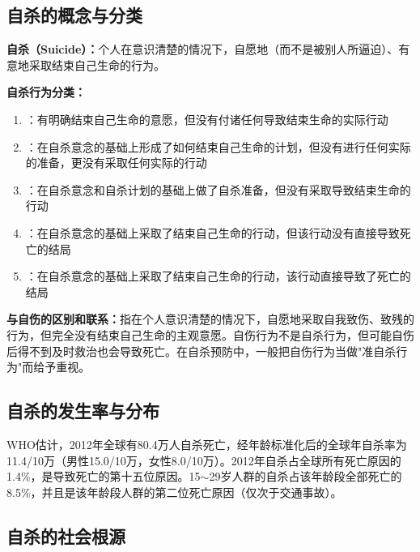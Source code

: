 \subsection{自杀的概念与分类}

\begin{keybox}
\textbf{自杀（Suicide）：}个人在意识清楚的情况下，自愿地（而不是被别人所逼迫）、有意地采取结束自己生命的行为。

\textbf{自杀行为分类：}
\begin{enumerate}[leftmargin=*]
    \item {}：有明确结束自己生命的意愿，但没有付诸任何导致结束生命的实际行动
    \item {}：在自杀意念的基础上形成了如何结束自己生命的计划，但没有进行任何实际的准备，更没有采取任何实际的行动
    \item {}：在自杀意念和自杀计划的基础上做了自杀准备，但没有采取导致结束生命的行动
    \item {}：在自杀意念的基础上采取了结束自己生命的行动，但该行动没有直接导致死亡的结局
    \item {}：在自杀意念的基础上采取了结束自己生命的行动，该行动直接导致了死亡的结局
\end{enumerate}

\textbf{与自伤的区别和联系：}指在个人意识清楚的情况下，自愿地采取自我致伤、致残的行为，但完全没有结束自己生命的主观意愿。自伤行为不是自杀行为，但可能自伤后得不到及时救治也会导致死亡。在自杀预防中，一般把自伤行为当做"准自杀行为"而给予重视。
\end{keybox}

\subsection{自杀的发生率与分布}

\begin{defbox}
WHO估计，2012年全球有80.4万人自杀死亡，经年龄标准化后的全球年自杀率为11.4/10万（男性15.0/10万，女性8.0/10万）。2012年自杀占全球所有死亡原因的1.4\%，是导致死亡的第十五位原因。15$\sim$29岁人群的自杀占该年龄段全部死亡的8.5\%，并且是该年龄段人群的第二位死亡原因（仅次于交通事故）。
\end{defbox}

\subsection{自杀的社会根源}

